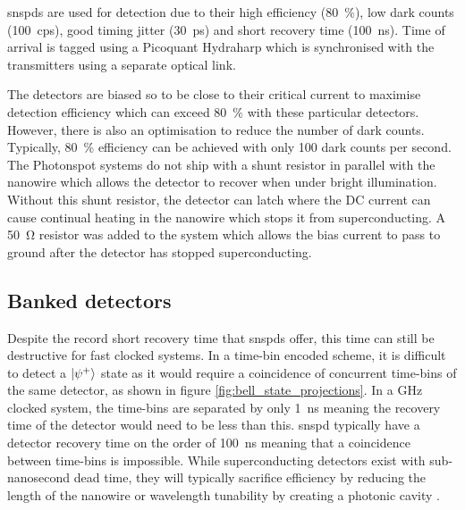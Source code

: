 \Acsp{snspd} are used for detection due to their high efficiency (\SI{80}{\percent}), low dark counts (\SI{100}{cps}), good timing jitter (\SI{30}{ps}) and short recovery time (\SI{100}{ns}). Time of arrival is tagged using a Picoquant Hydraharp which is synchronised with the transmitters using a separate optical link.

The detectors are biased so to be close to their critical current to maximise detection efficiency which can exceed \SI{80}{\percent} with these particular detectors. However, there is also an optimisation to reduce the number of dark counts. Typically, \SI{80}{\percent} efficiency can be achieved with only 100 dark counts per second. The Photonspot systems do not ship with a shunt resistor in parallel with the nanowire which allows the detector to recover when under bright illumination. Without this shunt resistor, the detector can latch where the DC current can cause continual heating in the nanowire which stops it from superconducting. A \SI{50}{\ohm} resistor was added to the system which allows the bias current to pass to ground after the detector has stopped superconducting. 


\subsection{Banked detectors}

Despite the record short recovery time that \acp{snspd} offer, this time can still be destructive for fast clocked systems. In a time-bin encoded scheme, it is difficult to detect a $\ket{\psi^+}$ state as it would require a coincidence of concurrent time-bins of the same detector, as shown in figure \ref{fig:bell_state_projections}. In a GHz clocked system, the time-bins are separated by only \SI{1}{\ns} meaning the recovery time of the detector would need to be less than this. \Ac{snspd} typically have a detector recovery time on the order of \SI{100}{\ns} meaning that a coincidence between time-bins is impossible. While superconducting detectors exist with sub-nanosecond dead time, they will typically sacrifice efficiency by reducing the length of the nanowire or wavelength tunability by creating a photonic cavity \cite{vetter2016, yun2019}.

